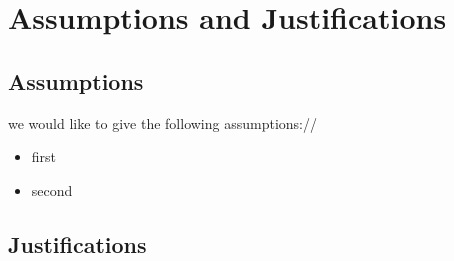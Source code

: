 \section{Assumptions and Justifications}
\subsection{Assumptions}
we would like to give the following assumptions://
\begin{itemize}
\item first
\item second
\end{itemize}
\subsection{Justifications}
